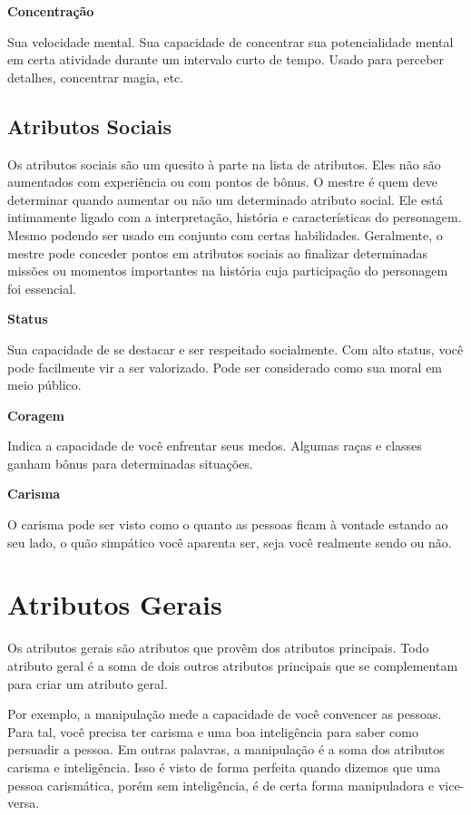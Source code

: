 \textbf{Concentração}

Sua velocidade mental. Sua capacidade de concentrar sua potencialidade mental em certa atividade durante um intervalo curto de tempo. Usado para perceber detalhes, concentrar magia, etc.

\subsection{Atributos Sociais}

Os atributos sociais são um quesito à parte na lista de atributos. Eles não são aumentados com experiência ou com pontos de bônus. O mestre é quem deve determinar quando aumentar ou não um determinado atributo social. Ele está intimamente ligado com a interpretação, história e características do personagem. Mesmo podendo ser usado em conjunto com certas habilidades. Geralmente, o mestre pode conceder pontos em atributos sociais ao finalizar determinadas missões ou momentos importantes na história cuja participação do personagem foi essencial.

\textbf{Status}

Sua capacidade de se destacar e ser respeitado socialmente. Com alto status, você pode facilmente vir a ser valorizado. Pode ser considerado como sua moral em meio público.

\textbf{Coragem}

Indica a capacidade de você enfrentar seus medos. Algumas raças e classes ganham bônus para determinadas situações.

\textbf{Carisma}

O carisma pode ser visto como o quanto as pessoas ficam à vontade estando ao seu lado, o quão simpático você aparenta ser, seja você realmente sendo ou não.

\section{Atributos Gerais}

Os atributos gerais são atributos que provêm dos atributos principais. Todo atributo geral é a soma de dois outros atributos principais que se complementam para criar um atributo geral.

Por exemplo, a manipulação mede a capacidade de você convencer as pessoas. Para tal, você precisa ter carisma e uma boa inteligência para saber como persuadir a pessoa. Em outras palavras, a manipulação é a soma dos atributos carisma e inteligência. Isso é visto de forma perfeita quando dizemos que uma pessoa carismática, porém sem inteligência, é de certa forma manipuladora e vice-versa. 

